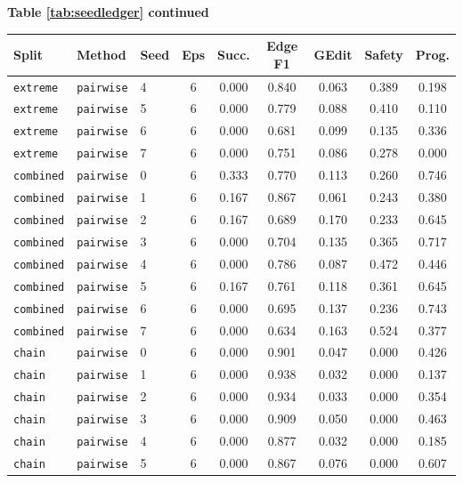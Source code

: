 \documentclass{article}
\begin{document}
\begin{center}
\textbf{Table \ref{tab:seedledger} continued}\\[0.4ex]
\begin{tabular}{lllcccccc}
\toprule
Split & Method & Seed & Eps & Succ. & Edge F1 & GEdit & Safety & Prog. \\
\midrule
\texttt{extreme} & \texttt{pairwise} & 4 & 6 & 0.000 & 0.840 & 0.063 & 0.389 & 0.198 \\
\texttt{extreme} & \texttt{pairwise} & 5 & 6 & 0.000 & 0.779 & 0.088 & 0.410 & 0.110 \\
\texttt{extreme} & \texttt{pairwise} & 6 & 6 & 0.000 & 0.681 & 0.099 & 0.135 & 0.336 \\
\texttt{extreme} & \texttt{pairwise} & 7 & 6 & 0.000 & 0.751 & 0.086 & 0.278 & 0.000 \\
\texttt{combined} & \texttt{pairwise} & 0 & 6 & 0.333 & 0.770 & 0.113 & 0.260 & 0.746 \\
\texttt{combined} & \texttt{pairwise} & 1 & 6 & 0.167 & 0.867 & 0.061 & 0.243 & 0.380 \\
\texttt{combined} & \texttt{pairwise} & 2 & 6 & 0.167 & 0.689 & 0.170 & 0.233 & 0.645 \\
\texttt{combined} & \texttt{pairwise} & 3 & 6 & 0.000 & 0.704 & 0.135 & 0.365 & 0.717 \\
\texttt{combined} & \texttt{pairwise} & 4 & 6 & 0.000 & 0.786 & 0.087 & 0.472 & 0.446 \\
\texttt{combined} & \texttt{pairwise} & 5 & 6 & 0.167 & 0.761 & 0.118 & 0.361 & 0.645 \\
\texttt{combined} & \texttt{pairwise} & 6 & 6 & 0.000 & 0.695 & 0.137 & 0.236 & 0.743 \\
\texttt{combined} & \texttt{pairwise} & 7 & 6 & 0.000 & 0.634 & 0.163 & 0.524 & 0.377 \\
\texttt{chain} & \texttt{pairwise} & 0 & 6 & 0.000 & 0.901 & 0.047 & 0.000 & 0.426 \\
\texttt{chain} & \texttt{pairwise} & 1 & 6 & 0.000 & 0.938 & 0.032 & 0.000 & 0.137 \\
\texttt{chain} & \texttt{pairwise} & 2 & 6 & 0.000 & 0.934 & 0.033 & 0.000 & 0.354 \\
\texttt{chain} & \texttt{pairwise} & 3 & 6 & 0.000 & 0.909 & 0.050 & 0.000 & 0.463 \\
\texttt{chain} & \texttt{pairwise} & 4 & 6 & 0.000 & 0.877 & 0.032 & 0.000 & 0.185 \\
\texttt{chain} & \texttt{pairwise} & 5 & 6 & 0.000 & 0.867 & 0.076 & 0.000 & 0.607 \\

\end{tabular}
\end{center}
\end{document}
